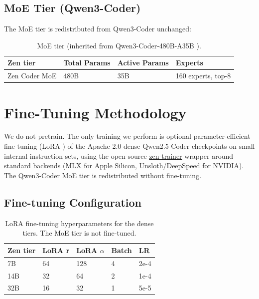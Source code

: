 \documentclass[11pt,a4paper]{article}
\begin{document}
\subsection{MoE Tier (Qwen3-Coder)}

The MoE tier is redistributed from Qwen3-Coder unchanged:

\begin{table}[H]
\centering
\begin{tabular}{llll}
\toprule
\textbf{Zen tier} & \textbf{Total Params} & \textbf{Active Params} & \textbf{Experts} \\
\midrule
Zen Coder MoE & 480B & 35B & 160 experts, top-8 \\
\bottomrule
\end{tabular}
\caption{MoE tier (inherited from Qwen3-Coder-480B-A35B \cite{qwen3coder}).}
\end{table}

\section{Fine-Tuning Methodology}
\label{sec:training}

We do not pretrain. The only training we perform is optional parameter-efficient fine-tuning (LoRA
\cite{lora}) of the Apache-2.0 dense Qwen2.5-Coder checkpoints on small internal instruction sets,
using the open-source \href{https://github.com/zenlm/zen-trainer}{zen-trainer} wrapper around standard
backends (MLX for Apple Silicon, Unsloth/DeepSpeed for NVIDIA). The Qwen3-Coder MoE tier is
redistributed without fine-tuning.

\subsection{Fine-tuning Configuration}

\begin{table}[H]
\centering
\begin{tabular}{lllll}
\toprule
\textbf{Zen tier} & \textbf{LoRA r} & \textbf{LoRA $\alpha$} & \textbf{Batch} & \textbf{LR} \\
\midrule
7B  & 64 & 128 & 4 & 2e-4 \\
14B & 32 & 64  & 2 & 1e-4 \\
32B & 16 & 32  & 1 & 5e-5 \\
\bottomrule
\end{tabular}
\caption{LoRA fine-tuning hyperparameters for the dense tiers. The MoE tier is not fine-tuned.}
\end{table}
\end{document}
